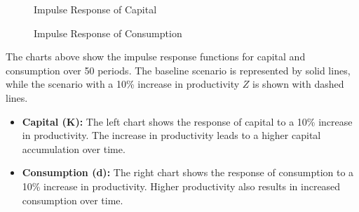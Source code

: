 \documentclass[12pt]{report}
\begin{document}
\begin{figure}[H]
    \centering
    \caption{Impulse Response of Capital}
    \label{fig:impulse_response_capital}
\end{figure}

\begin{figure}[H]
    \centering
    \caption{Impulse Response of Consumption}
    \label{fig:impulse_response_consumption}
\end{figure}

The charts above show the impulse response functions for capital and consumption over 50 periods. The baseline scenario is represented by solid lines, while the scenario with a 10\% increase in productivity \(Z\) is shown with dashed lines.

\begin{itemize}
    \item \textbf{Capital (K):} The left chart shows the response of capital to a 10\% increase in productivity. The increase in productivity leads to a higher capital accumulation over time.
    \item \textbf{Consumption (d):} The right chart shows the response of consumption to a 10\% increase in productivity. Higher productivity also results in increased consumption over time.
\end{itemize}
\end{document}
